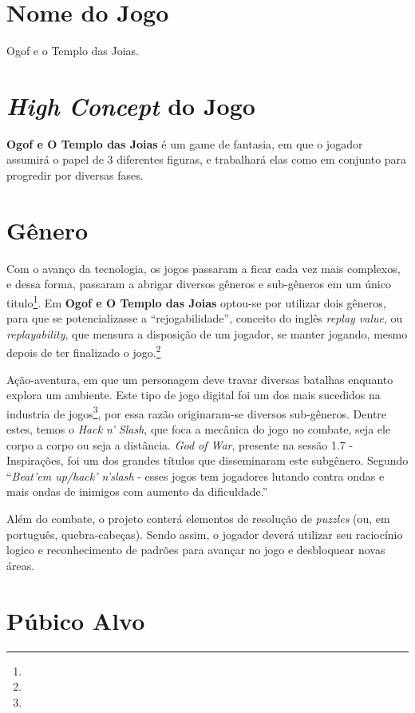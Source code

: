 \section{Nome do Jogo} Ogof e o Templo das Joias.

\section{\textit{High Concept} do Jogo}\textbf{ Ogof e O Templo das Joias} é um game de
fantasia, em que o jogador assumirá o papel de 3 diferentes figuras, e trabalhará elas como
em conjunto para progredir por diversas fases.

\section{Gênero}
Com o avanço da tecnologia, os jogos passaram a ficar cada vez mais complexos, e dessa forma, passaram a abrigar diversos gêneros e sub-gêneros em um único titulo\footnote{}. Em \textbf{Ogof e O Templo das Joias} optou-se por utilizar dois gêneros, para que se potencializasse a ``rejogabilidade'', conceito do inglês \textit{replay value}, ou \textit{replayability}, que mensura a disposição de um jogador, se manter jogando, mesmo depois de ter finalizado o jogo.\footnote{}

Ação-aventura, em que um personagem deve travar diversas batalhas enquanto explora um ambiente. Este tipo de jogo digital foi um dos mais sucedidos na industria de jogos\footnote{}, por essa razão originaram-se diversos sub-gêneros. Dentre estes, temos o \textit{Hack n' Slash}, que foca a mecânica do jogo no combate, seja ele corpo a corpo ou seja a distância. \textit{God of War}, presente  na sessão 1.7 - Inspirações, foi um dos grandes títulos que disseminaram este subgênero. Segundo  ``\textit{Beat'em up/hack' n'slash} - esses jogos tem jogadores lutando contra ondas e mais ondas de inimigos com aumento da dificuldade.''

Além do combate, o projeto conterá elementos de resolução de \textit{puzzles} (ou, em português, quebra-cabeças). Sendo assim, o jogador deverá utilizar seu raciocínio logico e reconhecimento de padrões para avançar no jogo e desbloquear novas áreas.

\section{Púbico Alvo}

